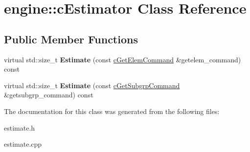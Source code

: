 \hypertarget{classengine_1_1cEstimator}{
\section{engine\-:\-:c\-Estimator \-Class \-Reference}
\label{classengine_1_1cEstimator}
}
\subsection*{\-Public \-Member \-Functions}
\begin{DoxyCompactItemize}
\item 
\hypertarget{classengine_1_1cEstimator_a6d2c3458e2ce412c10a355d651d9b98f}{
virtual std\-::size\-\_\-t {\bfseries \-Estimate} (const \hyperlink{classengine_1_1cGetElemCommand}{c\-Get\-Elem\-Command} \&getelem\-\_\-command) const }
\label{classengine_1_1cEstimator_a6d2c3458e2ce412c10a355d651d9b98f}

\item 
\hypertarget{classengine_1_1cEstimator_a5d01ef59d58b212bda923a4a61f00d58}{
virtual std\-::size\-\_\-t {\bfseries \-Estimate} (const \hyperlink{classengine_1_1cGetSubgrpCommand}{c\-Get\-Subgrp\-Command} \&getsubgrp\-\_\-command) const }
\label{classengine_1_1cEstimator_a5d01ef59d58b212bda923a4a61f00d58}

\end{DoxyCompactItemize}


\-The documentation for this class was generated from the following files\-:\begin{DoxyCompactItemize}
\item 
estimate.\-h\item 
estimate.\-cpp\end{DoxyCompactItemize}
